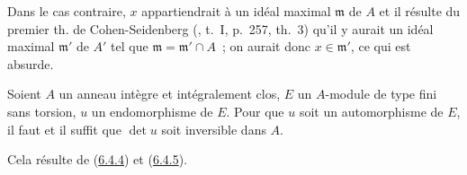 Dans le cas contraire, $x$ appartiendrait à un idéal maximal $\mathfrak{m}$
de $A$ et il résulte du premier th. de Cohen-Seidenberg
(\cite{I-13}, t.~I, p.~257, th.~3) qu'il y aurait un idéal maximal
$\mathfrak{m}'$ de $A'$ tel que $\mathfrak{m}=\mathfrak{m}'\cap A$~; on aurait
donc $x\in\mathfrak{m}'$, ce qui est absurde.

\begin{corollary}[6.4.6]
\label{II.6.4.6-fr}
Soient $A$ un anneau intègre et intégralement clos, $E$ un $A$-module de type
fini sans torsion, $u$ un endomorphisme de $E$. Pour que $u$ soit un
automorphisme de $E$, il faut et il suffit que $\det u$ soit inversible dans
$A$.
\end{corollary}

Cela résulte de (\hyperref[II.6.4.4-fr]{6.4.4}) et
(\hyperref[II.6.4.5-fr]{6.4.5}).

